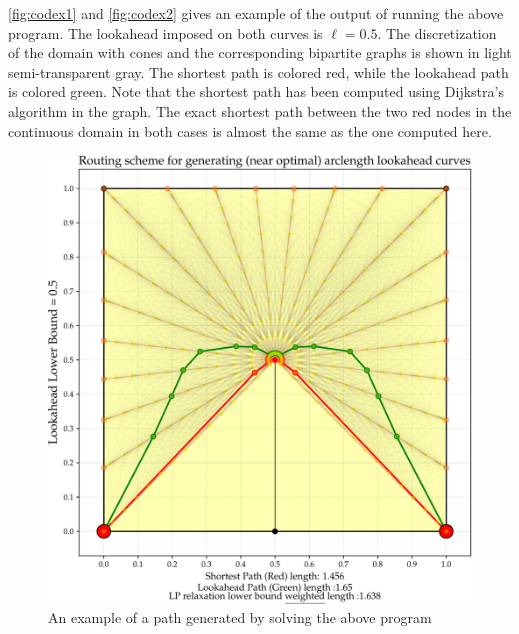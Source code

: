 \autoref{fig:codex1} and \autoref{fig:codex2} gives an example of the output of running the above program. The lookahead imposed on both curves is $\ell = 0.5$. 
The discretization of the domain with cones and the corresponding bipartite graphs is shown in light semi-transparent gray.
The shortest path is colored red, while the lookahead path is colored green. Note that the shortest path has been computed
using Dijkstra's algorithm in the graph. The exact shortest path between the two red nodes in the continuous domain in both cases is almost the same as the one computed here. 


\begin{figure}[H]
\centering
\begin{minipage}[t]{0.5\textwidth}
\includegraphics[width=\textwidth]{miscimages/lookex-standard.pdf}
\end{minipage}
\caption{An example of a path generated by solving the above program}
\label{fig:codex1}
\end{figure}


